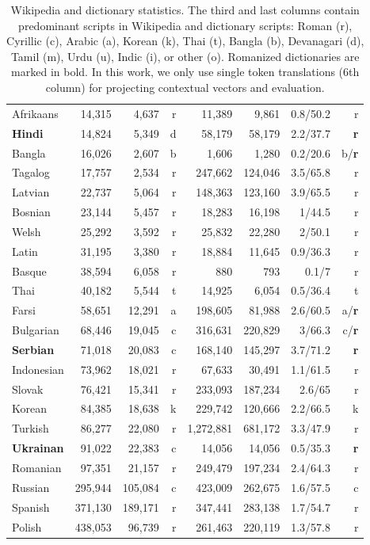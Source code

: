 \documentclass{article}
\begin{document}
\begin{table}[h!]
\begin{center}
\begin{tabular}{l|rrr|rrrr|}
Afrikaans	&	14,315	&	4,637	&	r	&	11,389	&	9,861	&	0.8/50.2	&	r\\
{\bf Hindi} 	&	14,824	&	5,349	&	d	&	58,179	&	58,179	&	2.2/37.7	&	{\bf r}\\
Bangla 	&	16,026	&	2,607	&	b	&	1,606	&	1,280	&	0.2/20.6	&	b/{\bf r}\\
Tagalog	&	17,757	&	2,534	&	r	&	247,662	&	124,046	&	3.5/65.8	&	r\\
Latvian	&	22,737	&	5,064	&	r	&	148,363	&	123,160	&	3.9/65.5	&	r\\
Bosnian 	&	23,144	&	5,457	&	r	&	18,283	&	16,198	&	1/44.5	&	r\\
Welsh	&	25,292	&	3,592	&	r	&	25,832	&	22,280	&	2/50.1	&	r\\
Latin 	&	31,195	&	3,380	&	r	&	18,884	&	11,645	&	0.9/36.3	&	r\\
Basque 	&	38,594	&	6,058	&	r	&	880	&	793	&	0.1/7	&	r\\
Thai	&	40,182	&	5,544	&	t	&	14,925	&	6,054	&	0.5/36.4	&	t\\
Farsi	&	58,651	&	12,291	&	a	&	198,605	&	81,988	&	2.6/60.5	&	a/{\bf r}\\
Bulgarian 	&	68,446	&	19,045	&	c	&	316,631	&	220,829	&	3/66.3	&	c/{\bf r}\\
{\bf Serbian}	&	71,018	&	20,083	&	c	&	168,140	&	145,297	&	3.7/71.2	&	{\bf r}\\
Indonesian 	&	73,962	&	18,021	&	r	&	67,633	&	30,491	&	1.1/61.5	&	r\\
Slovak 	&	76,421	&	15,341&	r	&	233,093	&	187,234	&	2.6/65	&	r\\
Korean	&	84,385	&	18,638		&	k	&	229,742	&	120,666	&	2.2/66.5	&	k\\
Turkish 	&	86,277	&	22,080	&	r	&	1,272,881	&	681,172	&	3.3/47.9	&	r\\
{\bf Ukrainan}	&	91,022	&	22,383	&	c	&	14,056	&	14,056	&	0.5/35.3	&	{\bf r}\\
Romanian	&	97,351	&	21,157	&	r	&	249,479	&	197,234	&	2.4/64.3	&	r\\
Russian	&	295,944	&	105,084	&	c	&	423,009	&	262,675	&	1.6/57.5	&	c\\
Spanish 	&	371,130	&	189,171	&	r	&	347,441	&	283,138	&	1.7/54.7	&	r\\
Polish	&	438,053	&	96,739	&	r	&	261,463	&	220,119	&	1.3/57.8	&	r\\
\end{tabular}
\end{center}
\normalsize
\caption{Wikipedia and dictionary statistics. The third and last columns contain predominant scripts in Wikipedia and dictionary scripts: Roman (r), Cyrillic (c), Arabic (a), Korean (k), Thai (t), Bangla (b), Devanagari (d), Tamil (m),  Urdu (u), Indic (i), or other (o).  Romanized dictionaries are marked in bold.  In this work, we only use single token translations (6th column) for projecting contextual vectors and evaluation.}
\label{fig:wikidictstats}
\end{table}
\end{document}
